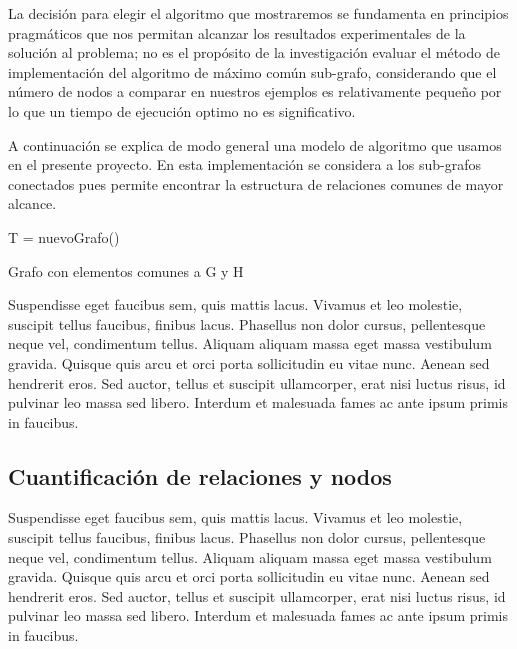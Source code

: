 La decisión para elegir el algoritmo que mostraremos se fundamenta en principios pragmáticos que nos permitan alcanzar los resultados experimentales de la solución al problema; no es el propósito de la investigación evaluar el método de implementación del algoritmo de máximo común sub-grafo, considerando que el número de nodos a comparar en nuestros ejemplos es relativamente pequeño por lo que un tiempo de ejecución optimo no es significativo.

A continuación se explica de modo general una modelo de algoritmo que usamos en el presente proyecto. En esta implementación se considera a los sub-grafos conectados pues permite encontrar la estructura de relaciones comunes de mayor alcance. 


\begin{algorithm}[H]
    T = nuevoGrafo()\;
    \; 
    \caption{Grafo con elementos comunes a G y H}
\end{algorithm}


Suspendisse eget faucibus sem, quis mattis lacus. Vivamus et leo molestie, suscipit tellus faucibus, finibus lacus. Phasellus non dolor cursus, pellentesque neque vel, condimentum tellus. Aliquam aliquam massa eget massa vestibulum gravida. Quisque quis arcu et orci porta sollicitudin eu vitae nunc. Aenean sed hendrerit eros. Sed auctor, tellus et suscipit ullamcorper, erat nisi luctus risus, id pulvinar leo massa sed libero. Interdum et malesuada fames ac ante ipsum primis in faucibus.

\label{def:cuantificacion}

\subsection {Cuantificación de relaciones y nodos}

Suspendisse eget faucibus sem, quis mattis lacus. Vivamus et leo molestie, suscipit tellus faucibus, finibus lacus. Phasellus non dolor cursus, pellentesque neque vel, condimentum tellus. Aliquam aliquam massa eget massa vestibulum gravida. Quisque quis arcu et orci porta sollicitudin eu vitae nunc. Aenean sed hendrerit eros. Sed auctor, tellus et suscipit ullamcorper, erat nisi luctus risus, id pulvinar leo massa sed libero. Interdum et malesuada fames ac ante ipsum primis in faucibus.